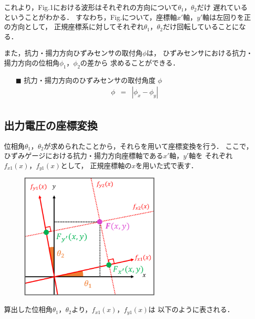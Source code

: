 \documentclass[twocolumn,a4j]{jsarticle}
\begin{document}
これより，Fig.1における波形はそれぞれの方向について$\theta_1$，$\theta_2$だけ
遅れているということがわかる．
すなわち，Fig.について，座標軸$x'$軸，$y'$軸は左回りを正の方向として，
正規座標系に対してそれぞれ$\theta_1$，$\theta_2$だけ回転していることになる．\par

また，抗力・揚力方向ひずみセンサの取付角$\phi$は，
ひずみセンサにおける抗力・揚力方向の位相角$\phi_1$，$\phi_2$の差から
求めることができる．

\begin{itemize}
    \item [$\blacksquare$] 抗力・揚力方向のひずみセンサの取付角度 $\phi$
          \begin{eqnarray*}
              \phi &=& \left| \phi_x - \phi_y \right| \\
          \end{eqnarray*}
\end{itemize}

\subsection{出力電圧の座標変換}
位相角$\theta_1$，$\theta_2$が求められたことから，それらを用いて座標変換を行う．
ここで，ひずみゲージにおける抗力・揚力方向座標軸である$x'$軸，$y'$軸を
それぞれ$f_{x1}\left(x\right)$，$f_{y1}\left(x\right)$として，
正規座標軸の$x$を用いた式で表す．

\begin{figure}[htbp]
    \footnotesize
    \begin{center}
        \includegraphics[width=70mm]{../images/image_3.png}
        \caption{}
    \end{center}
\end{figure}

算出した位相角$\theta_1$，$\theta_2$より，$f_{x1}\left(x\right)$，$f_{y1}\left(x\right)$は
以下のように表される．
\end{document}
